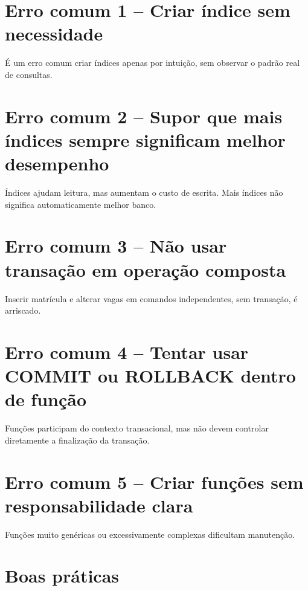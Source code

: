 \section{Erro comum 1 -- Criar índice sem necessidade}

É um erro comum criar índices apenas por intuição, sem observar o padrão real de consultas.

\section{Erro comum 2 -- Supor que mais índices sempre significam melhor desempenho}

Índices ajudam leitura, mas aumentam o custo de escrita. Mais índices não significa automaticamente melhor banco.

\section{Erro comum 3 -- Não usar transação em operação composta}

Inserir matrícula e alterar vagas em comandos independentes, sem transação, é arriscado.

\section{Erro comum 4 -- Tentar usar COMMIT ou ROLLBACK dentro de função}

Funções participam do contexto transacional, mas não devem controlar diretamente a finalização da transação.

\section{Erro comum 5 -- Criar funções sem responsabilidade clara}

Funções muito genéricas ou excessivamente complexas dificultam manutenção.

\section{Boas práticas}

